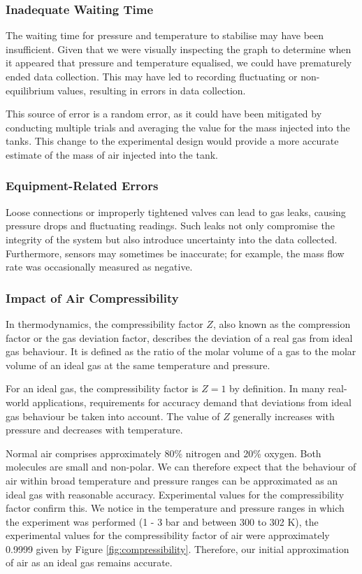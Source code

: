 \documentclass[titlepage, twocolumn, 12pt]{article}
\begin{document}
\subsubsection*{Inadequate Waiting Time}
\vspace{-0.5cm}
The waiting time for pressure and temperature to stabilise may have been insufficient. Given that we were visually inspecting the graph to determine when it appeared that pressure and temperature equalised, we could have prematurely ended data collection. This may have led to recording fluctuating or non-equilibrium values, resulting in errors in data collection.

This source of error is a random error, as it could have been mitigated by conducting multiple trials and averaging the value for the mass injected into the tanks. This change to the experimental design would provide a more accurate estimate of the mass of air injected into the tank.
\subsubsection*{Equipment-Related Errors}
\vspace{-0.5cm}
Loose connections or improperly tightened valves can lead to gas leaks, causing pressure drops and fluctuating readings. Such leaks not only compromise the integrity of the system but also introduce uncertainty into the data collected. Furthermore, sensors may sometimes be inaccurate; for example, the mass flow rate was occasionally measured as negative.

\subsubsection*{Impact of Air Compressibility}
\vspace{-0.5cm}
In thermodynamics, the compressibility factor \(Z\), also known as the compression factor or the gas deviation factor, describes the deviation of a real gas from ideal gas behaviour. It is defined as the ratio of the molar volume of a gas to the molar volume of an ideal gas at the same temperature and pressure.

For an ideal gas, the compressibility factor is \(Z = 1\) by definition. In many real-world applications, requirements for accuracy demand that deviations from ideal gas behaviour be taken into account. The value of \(Z\) generally increases with pressure and decreases with temperature.

Normal air comprises approximately 80\% nitrogen and 20\% oxygen. Both molecules are small and non-polar. We can therefore expect that the behaviour of air within broad temperature and pressure ranges can be approximated as an ideal gas with reasonable accuracy. Experimental values for the compressibility factor confirm this. We notice in the temperature and pressure ranges in which the experiment was performed (1 - 3 bar and between 300 to 302 K), the experimental values for the compressibility factor of air were approximately 0.9999 given by Figure \ref{fig:compressibility}. Therefore, our initial approximation of air as an ideal gas remains accurate.
\end{document}
